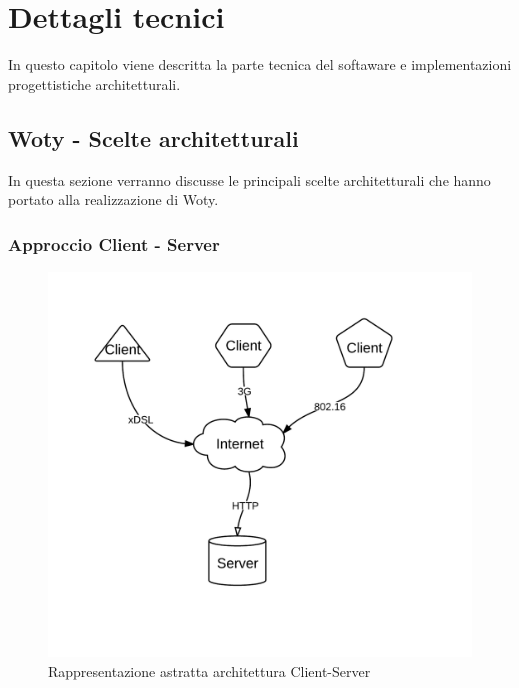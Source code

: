 


\chapter{Dettagli tecnici}


In questo capitolo viene descritta la parte tecnica del softaware e implementazioni progettistiche architetturali. 

\section{Woty - Scelte architetturali}
In questa sezione verranno discusse le principali scelte architetturali che hanno portato alla realizzazione di Woty. 

\subsection{Approccio Client - Server}

\begin{center}
\begin{figure}[ht]
\centering
\includegraphics[scale=0.55]{images/cap2/Client-server.png}
\caption{Rappresentazione astratta architettura Client-Server}
\end{figure}
\end{center}

